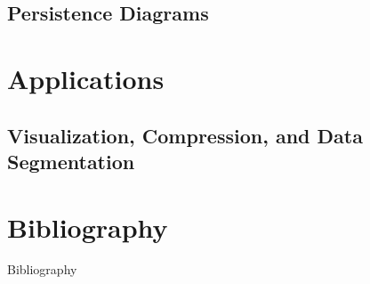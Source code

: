 \subsection{Persistence Diagrams}
\begin{frame}
\end{frame}

\section{Applications}
\subsection{Visualization, Compression, and Data Segmentation}
\begin{frame}
\end{frame}

\section*{Bibliography}
\begin{frame}{Bibliography}
	\nocite{wagner}
	\nocite{hatcher}
	\nocite{fraleigha}
	\begingroup
	\renewcommand{\section}[2]{}%
	
	\endgroup
\end{frame}





